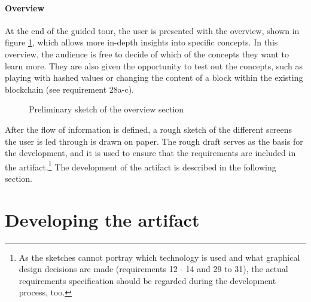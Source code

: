 \paragraph{Overview} At the end of the guided tour, the user is presented with the overview, shown in figure \ref{fig:OverviewPic}, which allows more in-depth insights into specific concepts.
In this overview, the audience is free to decide of which of the concepts they want to learn more. They are also given the opportunity to test out the concepts, such as playing with hashed values or changing the content of a block within the existing blockchain (see requirement 28a-c).

\begin{figure}
    \centering
    
    \caption{Preliminary sketch of the overview section}
    \label{fig:OverviewPic}
\end{figure}

After the flow of information is defined, a rough sketch of the different screens the user is led through is drawn on paper. The rough draft serves as the basis for the development, and it is used to ensure that the requirements are included in the artifact.\footnote{As the sketches cannot portray which technology is used and what graphical design decisions are made (requirements 12 - 14 and 29 to 31), the actual requirements specification should be regarded during the development process, too.} The development of the artifact is described in the following section.

\section{Developing the artifact} \label{sec:DevArtifact}


